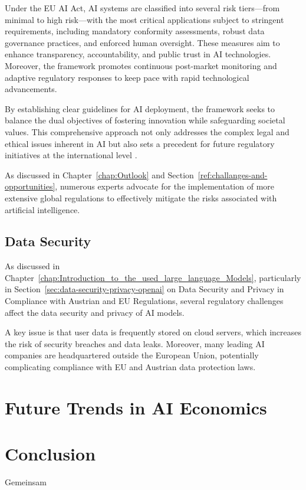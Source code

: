 Under the EU AI Act, AI systems are classified into several risk tiers—from minimal to high risk—with the most critical applications subject to stringent requirements, including mandatory conformity assessments, robust data governance practices, and enforced human oversight. These measures aim to enhance transparency, accountability, and public trust in AI technologies. Moreover, the framework promotes continuous post-market monitoring and adaptive regulatory responses to keep pace with rapid technological advancements.

By establishing clear guidelines for AI deployment, the framework seeks to balance the dual objectives of fostering innovation while safeguarding societal values. This comprehensive approach not only addresses the complex legal and ethical issues inherent in AI but also sets a precedent for future regulatory initiatives at the international level \cite{EURegFrameworkAI}.

As discussed in Chapter~\ref{chap:Outlook} and Section~\ref{ref:challanges-and-opportunities}, numerous experts advocate for the implementation of more extensive global regulations to effectively mitigate the risks associated with artificial intelligence.

\subsection{Data Security}

As discussed in Chapter~\ref{chap:Introduction_to_the_used_large_language_Models}, particularly in Section~\ref{sec:data-security-privacy-openai} on Data Security and Privacy in Compliance with Austrian and EU Regulations, several regulatory challenges affect the data security and privacy of AI models.

A key issue is that user data is frequently stored on cloud servers, which increases the risk of security breaches and data leaks. Moreover, many leading AI companies are headquartered outside the European Union, potentially complicating compliance with EU and Austrian data protection laws.


\section{Future Trends in AI Economics}
\label{sec:future-trends-in-ai-economics}

\section{Conclusion}
Gemeinsam


